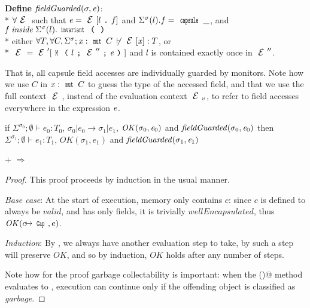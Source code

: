 \noindent\textbf{Define} $\mathit{fieldGuarded}(\sigma,{\mathit{e}})$:\\*
\indent$\forall \ctx$ such that $\e=\ctx[l\singleDot\f] $
and $\Sigma^\sigma(l).f=\Kw{capsule}\,\_$, and $\f\mathrel{\mathit{inside}} \Sigma^\sigma(l).\invariant$\\*
\indent\indent either
$\forall T, \forall C, \Sigma^\sigma;\x:\Kw{mut}\,C\,\not\vdash\ctx[\x]:T$, or\\*
\indent\indent $\ctx=\ctx'[\M{l}{\ctx''}{\e}]$ and $l$ is contained exactly once in $\ctx''$.

That is, all \Q@mut@ capsule field accesses are individually guarded by monitors.
Note how we use $C$ in $\x:\Kw{mut}\,C$ to guess the type of the accessed field,
and that we use the full context $\ctx$, instead of the evaluation context $\ctx_v$,
to refer to field accesses everywhere in the expression ${\mathit{e}}$.


\begin{theorem}\rm
if $\Sigma^{\sigma_0};\emptyset\vdash e_0: T_0$,
$\sigma_0|e_0\rightarrow \sigma_1|e_1$,
$\mathit{OK}(\sigma_0,{\mathit{e}}_0)$
and
$\mathit{fieldGuarded}(\sigma_0,{\mathit{e}}_0)$
then
$\Sigma^{\sigma_1};\emptyset\vdash e_1: T_1$,
$\mathit{OK}(\sigma_1,e_1)$ and
$\mathit{fieldGuarded}(\sigma_1,{\mathit{e}}_1)$
\end{theorem}

\begin{theorem}\rm
	 +  $\Rightarrow$ 
\end{theorem}
\begin{proof}
This proof proceeds by induction in the usual manner.

\emph{Base case}: At the start of execution, memory only contains $c$: since $c$ is defined to always be $\mathit{valid}$, and has only \Q@mut@ fields, it is trivially $\mathit{wellEncapsulated}$, thus $\mathit{OK}(c\mapsto\Kw{Cap},e)$.

\emph{Induction}: By , we always have another evaluation step to take, by  such a step will preserve $\mathit{OK}$, and so by induction, $\mathit{OK}$ holds after any number of steps.

Note how for the proof garbage collectability is important:
when the \Q@invariant()@ method evaluates to \Q@false@,
execution can continue only if the offending object is classified as \emph{garbage}.
\end{proof}

